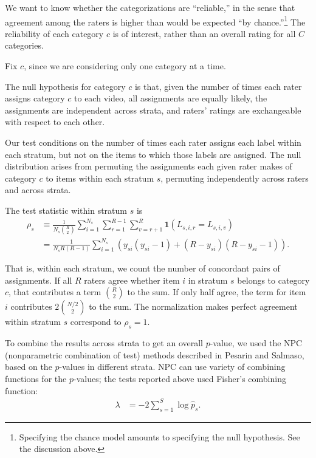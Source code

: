 \documentclass[]{article}
\begin{document}
We want to know whether the categorizations are ``reliable,'' in the sense that
agreement among the raters is higher than would be expected ``by chance.''\footnote{
   Specifying the chance model amounts to specifying the null hypothesis.
   See the discussion above.
}
The reliability of each category $c$ is of interest, rather than an overall
rating for all $C$ categories.

Fix $c$, since we are considering only one category at a time.

The null hypothesis for category $c$ is that, given the number of times
each rater assigns category $c$ to each video, all assignments
are equally likely, the assignments are independent across strata,
and raters' ratings are exchangeable with respect to
each other.

Our test conditions on the number of times each rater assigns each label within each
stratum, but not on the items to which those labels are assigned.
The null distribution arises from permuting the assignments each given rater makes
of category $c$ to items within each stratum $s$, permuting independently
across raters and across strata.

The test statistic within stratum $s$ is
\begin{align*}
\rho_s &\equiv \frac{1}{N_s {R \choose 2}} \sum_{i=1}^{N_s}
              \sum_{r=1}^{R-1} \sum_{v=r+1}^R \mathbf{1}(L_{s,i,r} = L_{s,i,v}) \\
              &= \frac{1}{N_s R(R-1)} \sum_{i=1}^{N_s}
                (y_{si}(y_{si}-1) + (R-y_{si})(R-y_{si}-1)).
\end{align*}

That is, within each stratum, we count the number of concordant pairs of
assignments.
If all $R$ raters agree whether item $i$ in stratum $s$ belongs to category
$c$, that contributes a term ${R \choose 2}$ to the sum.
If only half agree, the term for item $i$ contributes $2 {N/2 \choose 2}$ to
the sum.
The normalization makes perfect agreement within stratum $s$ correspond to
$\rho_s = 1$.

To combine the results across strata to get an overall $p$-value, we 
used the NPC (nonparametric
combination of test) methods described in Pesarin and Salmaso, based on
the $p$-values in different strata.
NPC can use  variety of combining functions for the $p$-values;
the tests reported above used Fisher's combining function:
\begin{align*}
    \lambda &= - 2\sum_{s=1}^S  \log \hat{p}_s.
\end{align*}
\end{document}
